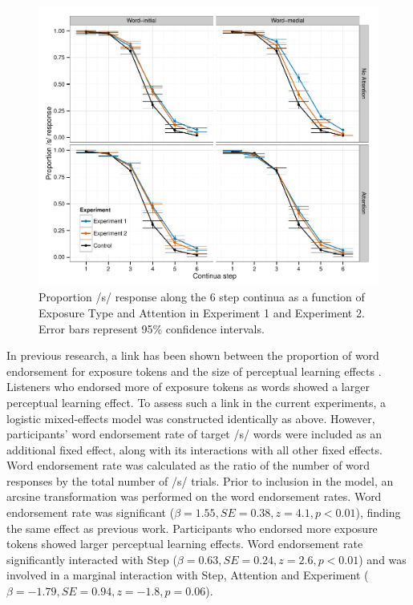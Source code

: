 \begin{figure}[!ht]
\caption{Proportion /s/ response along the 6 step continua as a function of Exposure Type and Attention in Experiment 1 and Experiment 2. Error bars represent 95\% confidence intervals.}
\label{fig:exp12categ}
\begin{center}
\includegraphics[width=\textwidth]{graphs/exp12_categresults}
\end{center}
\end{figure}

In previous research, a link has been shown between the proportion of word endorsement for exposure tokens and the size of perceptual learning effects \citep{Scharenborg2013}.
Listeners who endorsed more of exposure tokens as words showed a larger perceptual learning effect.
To assess such a link in the current experiments, a logistic mixed-effects model was constructed identically as above.
However, participants' word endorsement rate of target /s/ words were included as an additional fixed effect, along with its interactions with all other fixed effects.
Word endorsement rate was calculated as the ratio of the number of word responses by the total number of /s/ trials.
Prior to inclusion in the model, an arcsine transformation was performed on the word endorsement rates.
Word endorsement rate was significant ($\beta = 1.55, SE = 0.38, z = 4.1, p < 0.01$), finding the same effect as previous work.
Participants who endorsed more exposure tokens showed larger perceptual learning effects.
Word endorsement rate significantly interacted with Step ($\beta = 0.63, SE = 0.24, z = 2.6, p < 0.01$) and was involved in a marginal  interaction with Step, Attention and Experiment ($\beta = -1.79, SE = 0.94, z = -1.8, p = 0.06$).

